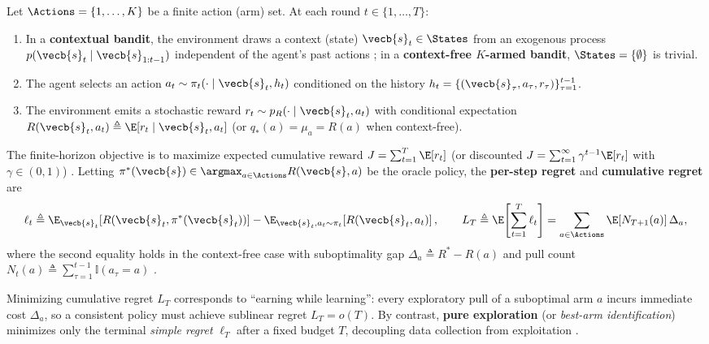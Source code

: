 \documentclass[../../../../master.tex]{subfiles}
\begin{document}
\begin{coremath}
Let $\Actions = \{1, \dots, K\}$ be a finite action (arm) set. At each round $t \in \{1, \dots, T\}$:
\begin{enumerate}
  \item In a \textbf{contextual bandit}, the environment draws a context (state) $\vecb{s}_t \in \States$ from an exogenous process $p(\vecb{s}_t \mid \vecb{s}_{1:t-1})$ independent of the agent's past actions ; in a \textbf{context-free $K$-armed bandit}, $\States = \{\emptyset\}$ is trivial.
  \item The agent selects an action $a_t \sim \pi_t(\cdot \mid \vecb{s}_t, h_t)$ conditioned on the history $h_t = \{(\vecb{s}_\tau, a_\tau, r_\tau)\}_{\tau=1}^{t-1}$.
  \item The environment emits a stochastic reward $r_t \sim p_R(\cdot \mid \vecb{s}_t, a_t)$ with conditional expectation $R(\vecb{s}_t, a_t) \triangleq \E[r_t \mid \vecb{s}_t, a_t]$ (or $q_*(a) = \mu_a = R(a)$ when context-free).
\end{enumerate}
The finite-horizon objective is to maximize expected cumulative reward $J = \sum_{t=1}^T \E[r_t]$ (or discounted $J = \sum_{t=1}^\infty \gamma^{t-1}\E[r_t]$ with $\gamma \in (0,1)$) . Letting $\pi^*(\vecb{s}) \in \argmax_{a \in \Actions} R(\vecb{s}, a)$ be the oracle policy, the \textbf{per-step regret} and \textbf{cumulative regret} are
\begin{equation}
  \ell_t \triangleq \E_{\vecb{s}_t}\!\left[R(\vecb{s}_t, \pi^*(\vecb{s}_t))\right] - \E_{\vecb{s}_t, a_t \sim \pi_t}\!\left[R(\vecb{s}_t, a_t)\right],
  \qquad
  L_T \triangleq \E\!\left[\sum_{t=1}^T \ell_t\right] = \sum_{a \in \Actions} \E[N_{T+1}(a)]\,\Delta_a,
  \label{eq:bandit:regret_decomp}
\end{equation}
where the second equality holds in the context-free case with suboptimality gap $\Delta_a \triangleq R^* - R(a)$ and pull count $N_t(a) \triangleq \sum_{\tau=1}^{t-1} \mathbb{I}(a_\tau = a)$ .
\end{coremath}

\begin{intuition}
Minimizing cumulative regret $L_T$ corresponds to ``earning while learning'': every exploratory pull of a suboptimal arm $a$ incurs immediate cost $\Delta_a$, so a consistent policy must achieve sublinear regret $L_T = o(T)$. By contrast, \textbf{pure exploration} (or \emph{best-arm identification}) minimizes only the terminal \emph{simple regret} $\ell_T$ after a fixed budget $T$, decoupling data collection from exploitation .
\end{intuition}
\end{document}

